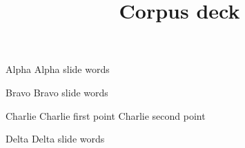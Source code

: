 \documentclass{beamer}
\title{Corpus deck}
\begin{document}
\begin{frame}{Alpha}
  Alpha slide words
\end{frame}
\begin{frame}{Bravo}
  Bravo slide words
\end{frame}
\begin{frame}{Charlie}
  Charlie first point \pause Charlie second point
\end{frame}
\begin{frame}{Delta}
  Delta slide words
\end{frame}
\end{document}
